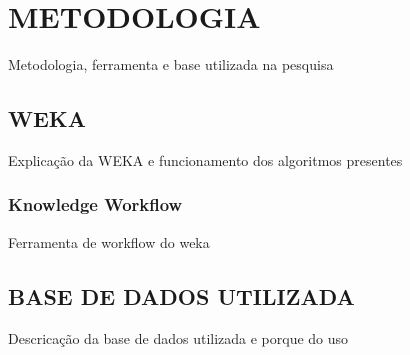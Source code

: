 
\chapter{METODOLOGIA}
\label{chap:metodologia}
Metodologia, ferramenta e base utilizada na pesquisa

\section{WEKA}
\label{sec:weka}
Explicação da WEKA e funcionamento dos algoritmos presentes

\subsection{Knowledge Workflow}
\label{subsec:knowledgeWorkflow}
Ferramenta de workflow do weka

\section{BASE DE DADOS UTILIZADA}
\label{sec:baseUtilizada}
Descricação da base de dados utilizada e porque do uso